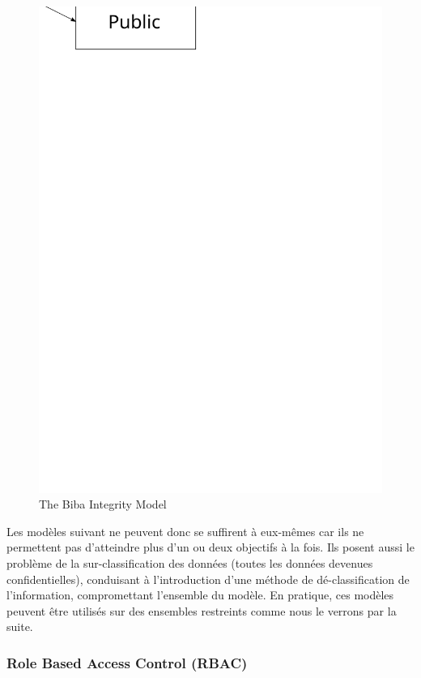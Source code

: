 \documentclass[pdftex,a4paper,titlepage,11pt]{article}
\begin{document}
\begin{figure}[h]
	\centering
	\includegraphics[scale=0.5]{biba}
	\caption{The Biba Integrity Model}
\end{figure}

\bigskip

Les modèles suivant ne peuvent donc se suffirent à eux-mêmes car ils ne
permettent pas d'atteindre plus d'un ou deux objectifs à la fois. Ils posent
aussi le problème de la sur-classification des données (toutes les données
devenues confidentielles), conduisant à l'introduction d'une méthode de
dé-classification de l'information, compromettant l'ensemble du modèle.
En pratique, ces modèles peuvent être utilisés sur des ensembles restreints
comme nous le verrons par la suite.

\subsubsection{Role Based Access Control (RBAC)}
\end{document}

